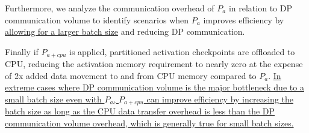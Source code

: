 Furthermore, we analyze the communication overhead of $P_a$ in relation to DP communication volume to identify scenarios when $P_a$ improves efficiency by \uline{allowing for a larger batch size} and reducing DP communication.

Finally if $P_{a+cpu}$ is applied, partitioned activation checkpoints are offloaded to CPU, reducing the activation memory requirement to nearly zero at the expense of 2x added data movement to and from CPU memory compared to $P_a$. \uline{In extreme cases where DP communication volume is the major bottleneck due to a small batch size even with $P_a$, $P_{a+cpu}$ can improve efficiency by increasing the batch size as long as the CPU data transfer overhead is less than the DP communication volume overhead, which is generally true for small batch sizes.}